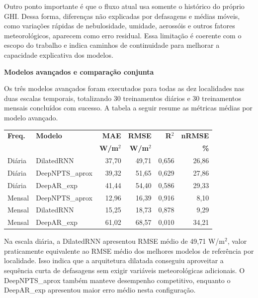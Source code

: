 \documentclass[12pt,a4paper]{article}
\begin{document}
Outro ponto importante é que o fluxo atual usa somente o histórico do próprio GHI. Dessa forma, diferenças não explicadas por defasagens e médias móveis, como variações rápidas de nebulosidade, umidade, aerossóis e outros fatores meteorológicos, aparecem como erro residual. Essa limitação é coerente com o escopo do trabalho e indica caminhos de continuidade para melhorar a capacidade explicativa dos modelos.

\vspace{12pt}

\noindent\textbf{Modelos avançados e comparação conjunta}

Os três modelos avançados foram executados para todas as dez localidades nas duas escalas temporais, totalizando 30 treinamentos diários e 30 treinamentos mensais concluídos com sucesso. A tabela a seguir resume as métricas médias por modelo avançado.

\vspace{6pt}

\begin{center}
\small
\begin{tabular}{llrrrr}
\toprule
\textbf{Freq.} & \textbf{Modelo} & \textbf{MAE} & \textbf{RMSE} & \textbf{R$^2$} & \textbf{nRMSE} \\
 & & \textbf{W/m$^2$} & \textbf{W/m$^2$} & & \textbf{\%} \\
\midrule
Diária & DilatedRNN & 37,70 & 49,71 & 0,656 & 26,86 \\
Diária & DeepNPTS\_aprox & 39,32 & 51,65 & 0,629 & 27,86 \\
Diária & DeepAR\_exp & 41,44 & 54,40 & 0,586 & 29,33 \\
Mensal & DeepNPTS\_aprox & 12,96 & 16,39 & 0,916 & 8,10 \\
Mensal & DilatedRNN & 15,25 & 18,73 & 0,878 & 9,29 \\
Mensal & DeepAR\_exp & 61,02 & 68,57 & 0,010 & 34,21 \\
\bottomrule
\end{tabular}
\end{center}

\vspace{6pt}

Na escala diária, a DilatedRNN apresentou RMSE médio de 49,71 W/m$^2$, valor praticamente equivalente ao RMSE médio dos melhores modelos de referência por localidade. Isso indica que a arquitetura dilatada conseguiu aproveitar a sequência curta de defasagens sem exigir variáveis meteorológicas adicionais. O DeepNPTS\_aprox também manteve desempenho competitivo, enquanto o DeepAR\_exp apresentou maior erro médio nesta configuração.
\end{document}
